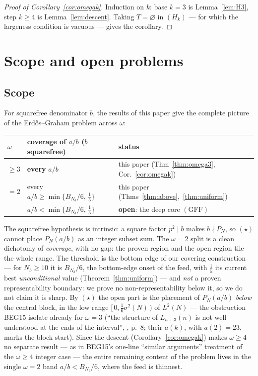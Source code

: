 \documentclass[11pt]{amsart}
\theoremstyle{plain}
\theoremstyle{definition}
\begin{document}
\begin{proof}[Proof of Corollary~\ref{cor:omegak}]
Induction on $k$: base $k=3$ is Lemma~\ref{lem:H3}, step $k\ge4$ is
Lemma~\ref{lem:descent}.  Taking $T=\varnothing$ in $(H_k)$ --- for which the
largeness condition is vacuous --- gives the corollary.
\end{proof}

\section{Scope and open problems}\label{sec:open}

\subsection{Scope}
For squarefree denominator $b$, the results of this paper give the complete picture
of the Erd\H{o}s--Graham problem across $\omega$:
\begin{center}
\begin{tabular}{lll}
\hline
$\omega$ & coverage of $a/b$ ($b$ squarefree) & status \\
\hline
$\ge3$ & \textbf{every} $a/b$ & this paper (Thm~\ref{thm:omega3}, Cor.~\ref{cor:omegak}) \\
$=2$ & every $a/b\ge\min\{B_{N_b}/6,\,\tfrac15\}$ & this paper (Thms~\ref{thm:above},~\ref{thm:uniform}) \\
& $a/b<\min\{B_{N_b}/6,\,\tfrac15\}$ & \textbf{open}: the deep core $(\mathrm{GFF})$ \\
\hline
\end{tabular}
\end{center}
The squarefree hypothesis is intrinsic: a square factor $p^2\mid b$ makes
$b\nmid P_N$, so $(\star)$ cannot place $P_N(a/b)$ as an integer subset sum.  The
$\omega=2$ split is a clean dichotomy of \emph{coverage}, with no gap: the proven
region and the open region tile the whole range.  The threshold is the bottom edge of
our covering construction --- for $N_b\ge10$ it is $B_{N_b}/6$, the bottom-edge onset
of the feed, with $\tfrac15$ its current best \emph{unconditional} value
(Theorem~\ref{thm:uniform}) --- and \emph{not} a proven representability boundary: we
prove no non-representability below it, so we do not claim it is sharp.  By
$(\star)$ the open part is the placement of $P_N(a/b)$ \emph{below} the central
block, in the low range $[\,0,\tfrac16\sigma^2(N)\,)$ of $L^2(N)$ --- the
obstruction BEG15 isolate already for $\omega=3$ (``the structure of $L_{n+3}(n)$
is not well understood at the ends of the interval'', \cite{BEG2015}, p.~8; their
$a(k)$, with $a(2)=23$, marks the block start).  Since the descent
(Corollary~\ref{cor:omegak}) makes $\omega\ge4$ no separate result --- as in
BEG15's one-line ``similar arguments'' treatment of the $\omega\ge4$ integer case
--- the entire remaining content of the problem lives in the single $\omega=2$ band
$a/b<B_{N_b}/6$, where the feed is thinnest.
\end{document}
